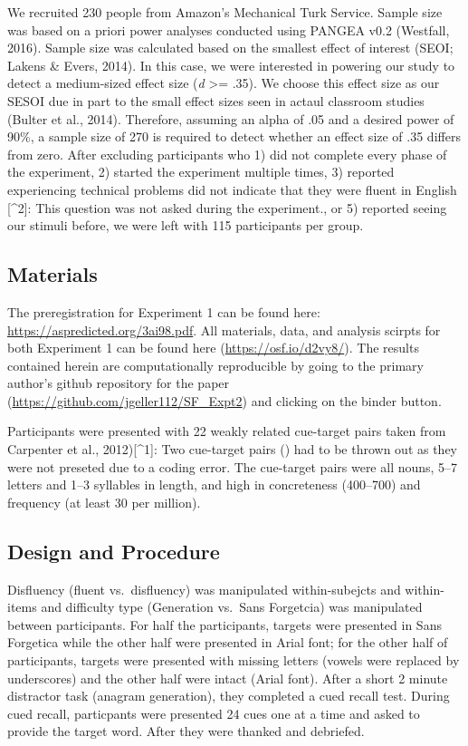 \documentclass[pdf]{apa6}
\begin{document}
We recruited 230 people from Amazon's Mechanical Turk Service. Sample size was based on a priori power analyses conducted using PANGEA v0.2 (Westfall, 2016). Sample size was calculated based on the smallest effect of interest (SEOI; Lakens \& Evers, 2014). In this case, we were interested in powering our study to detect a medium-sized effect size (\emph{d} \textgreater{}= .35). We choose this effect size as our SESOI due in part to the small effect sizes seen in actaul classroom studies (Bulter et al., 2014). Therefore, assuming an alpha of .05 and a desired power of 90\%, a sample size of 270 is required to detect whether an effect size of .35 differs from zero. After excluding participants who 1) did not complete every phase of the experiment, 2) started the experiment multiple times, 3) reported experiencing technical problems did not indicate that they were fluent in English {[}\^{}2{]}: This question was not asked during the experiment., or 5) reported seeing our stimuli before, we were left with 115 participants per group.

\hypertarget{materials}{%
\subsection{Materials}\label{materials}}

The preregistration for Experiment 1 can be found here: \url{https://aspredicted.org/3ai98.pdf}. All materials, data, and analysis scirpts for both Experiment 1 can be found here (\url{https://osf.io/d2vy8/}). The results contained herein are computationally reproducible by going to the primary author's github repository for the paper (\url{https://github.com/jgeller112/SF_Expt2}) and clicking on the binder button.

Participants were presented with 22 weakly related cue-target pairs taken from Carpenter et al., 2012){[}\^{}1{]}: Two cue-target pairs () had to be thrown out as they were not preseted due to a coding error. The cue-target pairs were all nouns, 5--7 letters and 1--3 syllables in length, and high in concreteness (400--700) and frequency (at least 30 per million).

\hypertarget{design-and-procedure}{%
\subsection{Design and Procedure}\label{design-and-procedure}}

Disfluency (fluent vs.~disfluency) was manipulated within-subejcts and within-items and difficulty type (Generation vs.~Sans Forgetcia) was manipulated between participants. For half the participants, targets were presented in Sans Forgetica while the other half were presented in Arial font; for the other half of participants, targets were presented with missing letters (vowels were replaced by underscores) and the other half were intact (Arial font). After a short 2 minute distractor task (anagram generation), they completed a cued recall test. During cued recall, particpants were presented 24 cues one at a time and asked to provide the target word. After they were thanked and debriefed.
\end{document}
